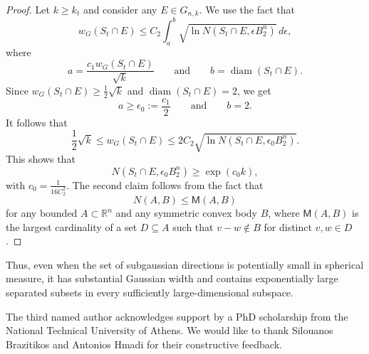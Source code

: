 \documentclass[11pt,leqno]{article}
\theoremstyle{definition}
\numberwithin{equation}{section}
\newcommand{\ls}{\leqslant}
\newcommand{\gr}{\geqslant}
\begin{document}
\begin{proof}
Let $k\gr  k_t$ and consider any $E\in G_{n,k}$. We use the fact that
$$w_G(S_t\cap E)\ls C_2\int_a^b\sqrt{\ln N(S_t\cap E,\epsilon B_2^n)}\,d\epsilon,$$
where
$$a=\frac{c_1w_G(S_t\cap E)}{\sqrt{k}}\qquad\text{and}\qquad b=\operatorname{diam}(S_t\cap E).$$
Since $w_G(S_t\cap E)\gr \frac{1}{2}\sqrt{k}$ and $\operatorname{diam}(S_t\cap E)=2$, we get
$$a\gr  \epsilon_0:=\frac{c_1}{2}\qquad\text{and}\qquad b= 2.$$
It follows that
$$\frac{1}{2}\sqrt{k}\ls w_G(S_t\cap E)\ls 2C_2\sqrt{\ln N(S_t\cap E,\epsilon_0B_2^n)}.$$
This shows that
$$N(S_t\cap E,\epsilon_0B_2^n)\gr \exp(c_0k),$$
with $c_0=\frac{1}{16C_2^2}$. The second claim follows from the fact that
$$N(A,B)\ls  \mathsf{M}(A,B)$$
for any bounded $A\subset\mathbb{R}^n$ and any symmetric convex body $B$, where
$\mathsf{M}(A,B)$ is the largest cardinality of a set $D\subseteq A$ such that
$v-w\notin B$ for distinct $v,w\in D$.
\end{proof}

Thus, even when the set of subgaussian directions is potentially small in spherical measure, it has substantial Gaussian width and contains 
exponentially large separated subsets in every sufficiently large-dimensional subspace.



\bigskip

 The third named author acknowledges support by a PhD scholarship
from the National Technical University of Athens. We would like to thank Silouanos Brazitikos and Antonios Hmadi for their constructive feedback.


\bigskip

\end{document}
